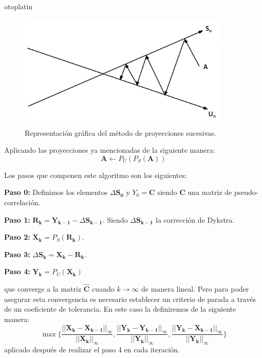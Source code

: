 otoplatin\documentclass[a4paper,openright,12pt]{report}
\begin{document}
\medskip 
\begin{figure}[htb]
\begin{center}
\includegraphics[width=10cm]{metodo_proyecciones2}
\caption{Representación gráfica del método de proyecciones sucesivas.}
\label{metodo_poyecciones}
\end{center}
\end{figure}

Aplicando las proyecciones ya mencionadas de la siguiente manera:
\begin{equation}
\mathbf{A} \leftarrow P_{U}(P_{S}(\mathbf{A}))
\label{def_alg5}
\end{equation}

Los pasos que componen este algoritmo son los siguientes:

\textbf{Paso 0:} Definimos los elementos $\Delta \mathbf{S_{0}}$ y $Y_{0}=\mathbf{C}$ siendo $\mathbf{C}$ una matriz de pseudo-correlación.

\textbf{Paso 1:} $\mathbf{R_{k}}=\mathbf{Y_{k-1}}-\Delta\mathbf{S_{k-1}}$. Siendo $\Delta\mathbf{S_{k-1}}$ la corrección de Dykstra.

\textbf{Paso 2:} $\mathbf{X_{k}}=P_{S}(\mathbf{R_{k}})$.

\textbf{Paso 3:} $\Delta\mathbf{S_{k}}=\mathbf{X_{k}}-\mathbf{R_{k}}$.

\textbf{Paso 4:} $\mathbf{Y_{k}}=P_{U}(\mathbf{X_{k}})$

que converge a la matriz $\mathbf{\widehat{C}}$ cuando $k \longrightarrow \infty$ de manera lineal. Pero para poder asegurar esta convergencia es necesario establecer un criterio de parada a través de un coeficiente de tolerancia. En este caso la definiremos de la siguiente manera: $$\max\lbrace\dfrac{\vert\vert\mathbf{X_{k}}-\mathbf{X_{k-1}}\vert\vert_{\infty}}{\vert\vert\mathbf{X_{k}}\vert\vert_{\infty}},\dfrac{\vert\vert\mathbf{Y_{k}}-\mathbf{Y_{k-1}}\vert\vert_{\infty}}{\vert\vert\mathbf{Y_{k}}\vert\vert_{\infty}},\dfrac{\vert\vert\mathbf{Y_{k}}-\mathbf{X_{k-1}}\vert\vert_{\infty}}{\vert\vert\mathbf{Y_{k}}\vert\vert_{\infty}}\rbrace$$
aplicado después de realizar el paso 4 en cada iteración.
\end{document}

